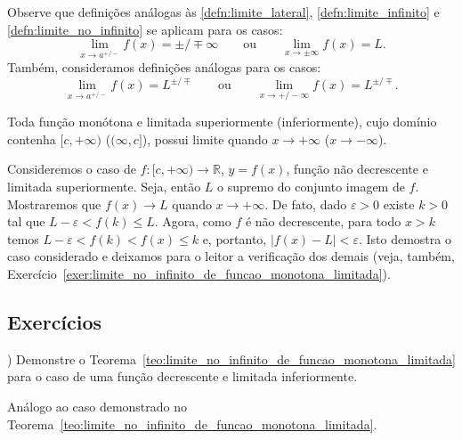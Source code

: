 \begin{obs}
  Observe que definições análogas às \ref{defn:limite_lateral}, \ref{defn:limite_infinito} e \ref{defn:limite_no_infinito} se aplicam para os casos:
  \begin{equation}
    \lim_{x\to a^{+/-}} f(x) = \pm/\mp \infty \qquad\text{ou}\qquad  \lim_{x\to \pm\infty} f(x) = L.
  \end{equation}
Também, consideramos definições análogas para os casos:
\begin{equation}
  \lim_{x\to a^{+/-}} f(x) = L^{\pm/\mp} \qquad\text{ou}\qquad \lim_{x\to +/- \infty} f(x) = L^{\pm/\mp}.
\end{equation}
\end{obs}

\begin{teo}\label{teo:limite_no_infinito_de_funcao_monotona_limitada}
  Toda função monótona e limitada superiormente (inferiormente), cujo domínio contenha $[c, +\infty)$ ($(\infty, c]$), possui limite quando $x\to +\infty$ ($x \to -\infty$).
\end{teo}
\begin{dem}
  Consideremos o caso de $f:[c, +\infty)\to\mathbb{R}$, $y=f(x)$, função não decrescente e limitada superiormente. Seja, então $L$ o supremo do conjunto imagem de $f$. Mostraremos que $f(x)\to L$ quando $x\to +\infty$. De fato, dado $\varepsilon>0$ existe $k>0$ tal que $L-\varepsilon < f(k) \leq L$. Agora, como $f$ é não decrescente, para todo $x>k$ temos $L-\varepsilon < f(k) < f(x) \leq k$ e, portanto, $|f(x)-L|<\varepsilon$. Isto demostra o caso considerado e deixamos para o leitor a verificação dos demais (veja, também, Exercício~\ref{exer:limite_no_infinito_de_funcao_monotona_limitada}).
\end{dem}

\subsection*{Exercícios}

\begin{exer}\label{exer:limite_no_infinito_de_funcao_monotona_limitada})
  Demonstre o Teorema~\ref{teo:limite_no_infinito_de_funcao_monotona_limitada} para o caso de uma função decrescente e limitada inferiormente.
\end{exer}
\begin{resp}
  Análogo ao caso demonstrado no Teorema~\ref{teo:limite_no_infinito_de_funcao_monotona_limitada}.
\end{resp}